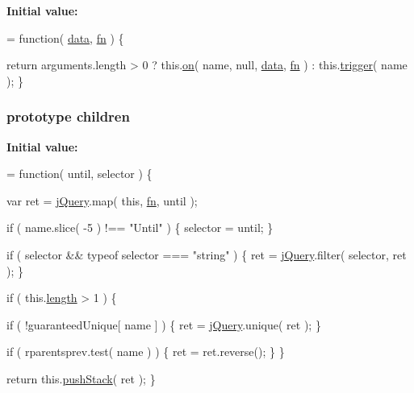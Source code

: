 {\bfseries Initial value\-:}
\begin{DoxyCode}
= \textcolor{keyword}{function}( \hyperlink{jquery-1_810_82-vsdoc_8js_a609407b3456fdc3c5671a9fc4a226ff7}{data}, \hyperlink{jquery-1_810_82-vsdoc_8js_acef6bdaf6b9b20fdcca1ea86f0902c3b}{fn} ) \{


        \textcolor{keywordflow}{return} arguments.length > 0 ?
            this.\hyperlink{jquery-1_810_82-vsdoc_8js_ae453b412b883f60220d73468ef6c6dbc}{on}( name, null, \hyperlink{jquery-1_810_82-vsdoc_8js_a609407b3456fdc3c5671a9fc4a226ff7}{data}, \hyperlink{jquery-1_810_82-vsdoc_8js_acef6bdaf6b9b20fdcca1ea86f0902c3b}{fn} ) :
            this.\hyperlink{jquery-1_810_82-vsdoc_8js_a2388c4114d5e3e4eab020f973641519c}{trigger}( name );
    \}
\end{DoxyCode}
\hypertarget{jquery-1_810_82-vsdoc_8js_a8f481f41dc3f2af7fcadd06c7fba0815}{
\subsubsection[{children}]{ {\bf prototype} children}}\label{jquery-1_810_82-vsdoc_8js_a8f481f41dc3f2af7fcadd06c7fba0815}
{\bfseries Initial value\-:}
\begin{DoxyCode}
= \textcolor{keyword}{function}( until, selector ) \{


        var ret = \hyperlink{jquery-1_810_82-vsdoc_8js_add5237586d970a38a81f990e8eb28c6c}{jQuery}.map( \textcolor{keyword}{this}, \hyperlink{jquery-1_810_82-vsdoc_8js_acef6bdaf6b9b20fdcca1ea86f0902c3b}{fn}, until );

        \textcolor{keywordflow}{if} ( name.slice( -5 ) !== \textcolor{stringliteral}{"Until"} ) \{
            selector = until;
        \}

        \textcolor{keywordflow}{if} ( selector && typeof selector === \textcolor{stringliteral}{"string"} ) \{
            ret = \hyperlink{jquery-1_810_82-vsdoc_8js_add5237586d970a38a81f990e8eb28c6c}{jQuery}.filter( selector, ret );
        \}

        \textcolor{keywordflow}{if} ( this.\hyperlink{jquery-1_810_82-vsdoc_8js_aa7de35d58da66d9944ab9cbe82c19640}{length} > 1 ) \{
            
            \textcolor{keywordflow}{if} ( !guaranteedUnique[ name ] ) \{
                ret = \hyperlink{jquery-1_810_82-vsdoc_8js_add5237586d970a38a81f990e8eb28c6c}{jQuery}.unique( ret );
            \}

            
            \textcolor{keywordflow}{if} ( rparentsprev.test( name ) ) \{
                ret = ret.reverse();
            \}
        \}

        \textcolor{keywordflow}{return} this.\hyperlink{jquery-1_810_82-vsdoc_8js_afc3a7db1ef2b526338c06c07cecccd44}{pushStack}( ret );
    \}
\end{DoxyCode}
